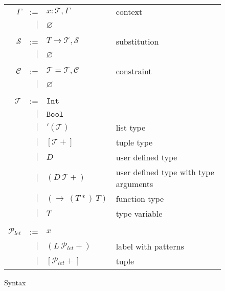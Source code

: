 \documentclass{article}
\begin{document}
\begin{figure}[tb]
    \centering
    \begin{tabular}{rrll}
    $\Gamma$ & :=  & $x : \mathcal{T}, \Gamma$ & context\\
        & $|$ & $\varnothing$ \\ \\

    $\mathcal{S}$ & :=  & $T \rightarrow \mathcal{T}, \mathcal{S}$ & substitution \\
        & $|$ & $\varnothing$ \\ \\

    $\mathcal{C}$ & :=  & $\mathcal{T} = \mathcal{T}, \mathcal{C}$ & constraint \\
        & $|$ & $\varnothing$ \\ \\

    $\mathcal{T}$ & :=  & $\mathtt{Int}$ \\
        & $|$ & $\mathtt{Bool}$ \\
        & $|$ & $'(\mathcal{T})$ & list type \\
        & $|$ & $[\mathcal{T}+]$ & tuple type \\
        & $|$ & $D$    & user defined type \\
        & $|$ & $(D\ \mathcal{T}+)$ & user defined type with type arguments \\
        & $|$ & $(\rightarrow\ (T*)\ T)$ & function type \\
        & $|$ & $T$ & type variable \\ \\

    $\mathcal{P}_{let}$ & :=  & $x$ \\
        & $|$ & $(L\ \mathcal{P}_{let}+)$ & label with patterns \\
        & $|$ & $[\mathcal{P}_{let}+]$ & tuple \\
    \end{tabular}
    \caption{Syntax}
\end{figure}
\end{document}
